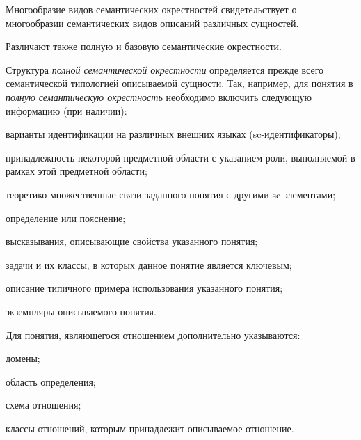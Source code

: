 \bigskip
Многообразие видов семантических окрестностей свидетельствует о многообразии семантических видов описаний различных сущностей.


Различают также полную и базовую семантические окрестности.

\begin{SCn}
\end{SCn}

\bigskip
Структура \textit{полной семантической окрестности} определяется прежде всего семантической типологией описываемой сущности. Так, например, для понятия в \textit{полную семантическую окрестность} необходимо включить следующую информацию (при наличии):
\begin{textitemize}
	\item{варианты идентификации на различных внешних языках (sc-идентификаторы)};
	\item{принадлежность некоторой предметной области с указанием роли, выполняемой в рамках этой предметной области};
	\item{теоретико-множественные связи заданного понятия с другими sc-элементами};
	\item{определение или пояснение};
	\item{высказывания, описывающие свойства указанного понятия};
	\item{задачи и их классы, в которых данное понятие является ключевым};
	\item{описание типичного примера использования указанного понятия};
	\item{экземпляры описываемого понятия}.
\end{textitemize}

Для понятия, являющегося отношением дополнительно указываются:

\begin{textitemize}
	\item{домены};
	\item{область определения};
	\item{схема отношения};
	\item{классы отношений, которым принадлежит описываемое отношение}.
\end{textitemize}

\begin{SCn}
\end{SCn}


